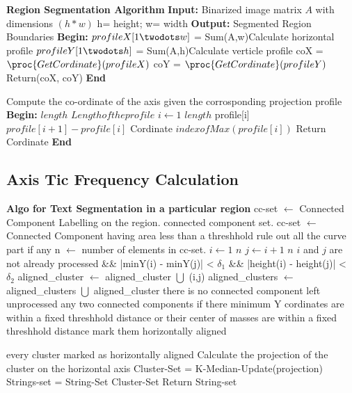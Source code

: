 \documentclass[12pt]{article}
\begin{document}
\begin{codebox}
\zi \textbf{Region Segmentation Algorithm}
\zi \textbf{Input:} Binarized image matrix $A$ with dimensions $(h*w)$
\zi \Comment h= height; w= width 
\zi \textbf{Output:} Segmented Region Boundaries
\zi \textbf{Begin:} \Indentmore
\zi $profileX[1 \twodots w]$ = Sum(A,w)\>\>\>\>\>\>\>\>\>\Comment Calculate horizontal profile
\zi $profileY[1 \twodots h]$ = Sum(A,h)\>\>\>\>\>\>\>\>\>\Comment Calculate verticle profile
\zi coX = $\proc{GetCordinate}(profileX)$
\zi coY = $\proc{GetCordinate}(profileY)$
\zi Return(coX, coY) \End
\zi \textbf{End}
\end{codebox}
\begin{codebox}
 \zi \Comment Compute the co-ordinate of the axis given the corrosponding projection profile 
\zi \textbf{Begin:} \Indentmore
\zi $length$ \gets $Length of the profile$
\zi \For $i \gets 1$ \To $length$
\zi 	\Do profile[i] \gets $profile[i+1] - profile[i]$
	\End
\zi Cordinate \gets $index of Max(profile[i])$
\zi Return Cordinate \End
\zi \textbf{End}


\end{codebox}

\subsection{Axis Tic Frequency Calculation}


\begin{codebox}
\zi \textbf{Algo for Text Segmentation in a particular region} \Indentmore
\zi cc-set $\gets$ Connected Component Labelling on the region.
\zi \Comment connected component set.
\zi cc-set $\gets$ Connected Component having area less than a threshhold
\zi rule out all the curve part if any
\zi n $\gets$ number of elements in cc-set.
\zi \For $i \gets 1$ \To $n$
\zi 	\For $j \gets i+1$ \To $n$
\zi		\if $i$ and $j$ are not already processed \Indentmore
\zi		&& |minY(i) - minY(j)| < $\delta_1$
\zi		&& |height(i) - height(j)| < $\delta_2$ \End
\zi		aligned_cluster $\gets$ aligned_cluster $\bigcup$ (i,j)
		\End
		\End
\zi	aligned_clusters $\gets$ aligned_clusters $\bigcup$ aligned_cluster
	\End
\zi \While there is no connected component left unprocessed
\zi 	\do
\zi 	\For any two connected components 
\zi	if there minimum Y cordinates are within a fixed threshhold distance or 
	their center of masses are within a fixed threshhold distance   
\zi	mark them horizontally aligned
	\End

\zi \For every cluster marked as horizontally aligned
\zi	Calculate the projection of the cluster on the horizontal axis
\zi		Cluster-Set = K-Median-Update(projection)
\zi 		Strings-set = String-Set \bigcup Cluster-Set
	\End
\zi Return String-set




\end{codebox}
\end{document}
